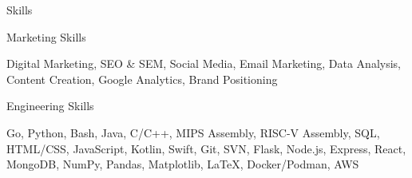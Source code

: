 \documentclass{resume}
\begin{document}
\begin{rSection}{\large Skills}

\begin{rSubsection}{Marketing Skills}{}{}{}
\item Digital Marketing, SEO \& SEM, Social Media, Email Marketing, Data Analysis, Content Creation, Google Analytics, Brand Positioning
\end{rSubsection}

\begin{rSubsection}{Engineering Skills}{}{}{}
    \item Go, Python, Bash, Java, C/C++, MIPS Assembly, RISC-V Assembly, SQL, HTML/CSS, JavaScript, Kotlin, Swift,  Git, SVN, Flask, Node.js, Express, React, MongoDB, NumPy, Pandas, Matplotlib, LaTeX, Docker/Podman, AWS
\end{rSubsection}

\end{rSection}
\end{document}
